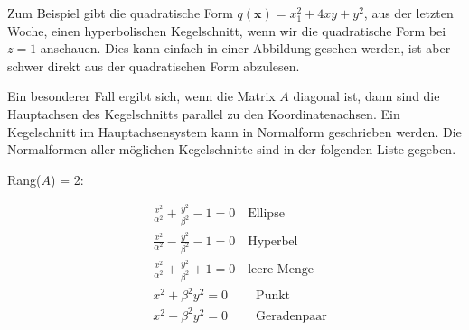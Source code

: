 \vspace{\baselineskip}

Zum Beispiel gibt die quadratische Form \( q(\mathbf{x}) = x_1^2 + 4xy + y^2 \), aus der letzten Woche, einen hyperbolischen Kegelschnitt, wenn wir die quadratische Form bei \( z = 1 \) anschauen. Dies kann einfach in einer Abbildung gesehen werden, ist aber schwer direkt aus der quadratischen Form abzulesen. 

\vspace{2\baselineskip}

\begin{figure}[h]
    \centering
\end{figure}

\newpage

Ein besonderer Fall ergibt sich, wenn die Matrix \( A \) diagonal ist, dann sind die Hauptachsen des Kegelschnitts parallel zu den Koordinatenachsen. Ein Kegelschnitt im Hauptachsensystem kann in Normalform geschrieben werden. Die Normalformen aller möglichen Kegelschnitte sind in der folgenden Liste gegeben.

\vspace{\baselineskip}

Rang(\( A \)) = 2:

\begin{equation*}
    \begin{aligned}
        & \frac{x^2}{\alpha^2} + \frac{y^2}{\beta^2} - 1 = 0  \quad \text{Ellipse} \\
        & \frac{x^2}{\alpha^2} - \frac{y^2}{\beta^2} - 1 = 0  \quad \text{Hyperbel} \\
        & \frac{x^2}{\alpha^2} + \frac{y^2}{\beta^2} + 1 = 0  \quad \text{leere Menge} \\
        & x^2 + \beta^2 y^2 = 0 \qquad \ \text{Punkt} \\[0.5em]
        & x^2 - \beta^2 y^2 = 0 \qquad \ \text{Geradenpaar} \\
    \end{aligned}
\end{equation*}
        
